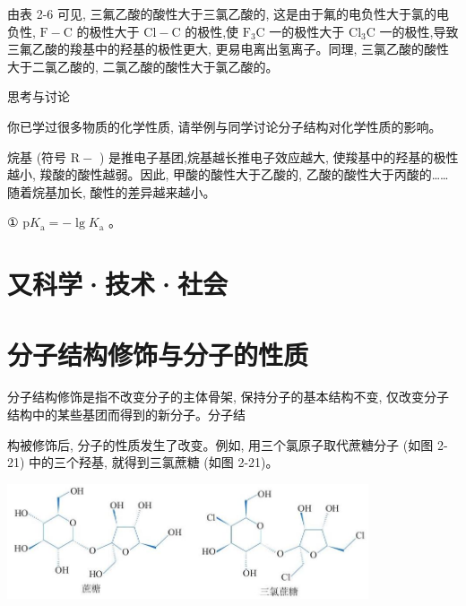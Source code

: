 \documentclass[10pt]{article}
\begin{document}
由表 2-6 可见, 三氟乙酸的酸性大于三氯乙酸的, 这是由于氟的电负性大于氯的电负性, \(\mathrm{F} - \mathrm{C}\) 的极性大于 \(\mathrm{{Cl}} - \mathrm{C}\) 的极性,使 \({\mathrm{F}}_{3}\mathrm{C}\) 一的极性大于 \({\mathrm{{Cl}}}_{3}\mathrm{C}\) 一的极性,导致三氟乙酸的羧基中的羟基的极性更大, 更易电离出氢离子。同理, 三氯乙酸的酸性大于二氯乙酸的, 二氯乙酸的酸性大于氯乙酸的。

\begin{mdframed}

思考与讨论

你已学过很多物质的化学性质, 请举例与同学讨论分子结构对化学性质的影响。

\end{mdframed}

烷基 (符号 \(\mathrm{R} -\) ) 是推电子基团,烷基越长推电子效应越大, 使羧基中的羟基的极性越小, 羧酸的酸性越弱。因此, 甲酸的酸性大于乙酸的, 乙酸的酸性大于丙酸的……随着烷基加长, 酸性的差异越来越小。

\begin{mdframed}

① \(\mathrm{p}{K}_{\mathrm{a}} = - \lg {K}_{\mathrm{a}}\) 。

\end{mdframed}

\section*{又科学·技术·社会}

\section*{分子结构修饰与分子的性质}

分子结构修饰是指不改变分子的主体骨架, 保持分子的基本结构不变, 仅改变分子结构中的某些基团而得到的新分子。分子结

构被修饰后, 分子的性质发生了改变。例如, 用三个氯原子取代蔗糖分子 (如图 2-21) 中的三个羟基, 就得到三氯蔗糖 (如图 2-21)。

\begin{center}
\includegraphics[max width=0.8\textwidth]{images/0190e026-5a11-7df7-bd27-54d09026ba7a_58_931420.jpg}
\end{center}
\end{document}
